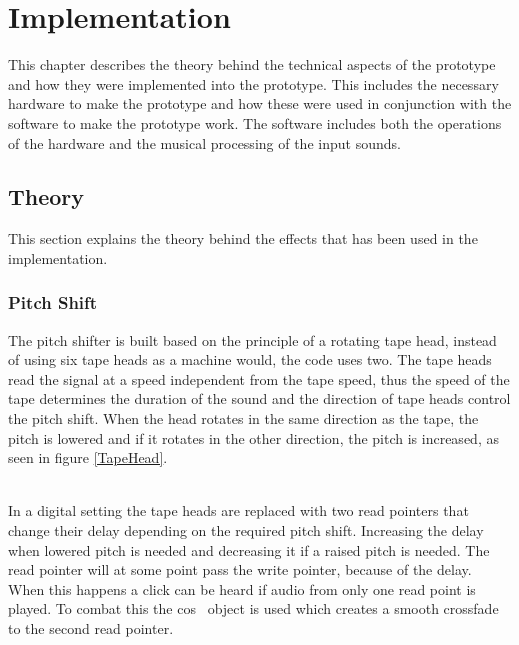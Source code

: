 \chapter{Implementation}

This chapter describes the theory behind the technical aspects of the prototype and how they were implemented into the prototype. This includes the necessary hardware to make the prototype and how these were used in conjunction with the software to make the prototype work. The software includes both the operations of the hardware and the musical processing of the input sounds.

\section{Theory}

This section explains the theory behind the effects that has been used in the implementation. 

\subsection{Pitch Shift}

The pitch shifter is built based on the principle of a rotating tape head, instead of using six tape heads as a machine would, the code uses two\citep{Katjaas_00}. The tape heads read the signal at a speed independent from the tape speed, thus the speed of the tape determines the duration of the sound and the direction of tape heads control the pitch shift. When the head rotates in the same direction as the tape, the pitch is lowered and if it rotates in the other direction, the pitch is increased, as seen in figure \ref{TapeHead}. \\

\begin{minipage}{\linewidth}%
\label{TapeHead}
\end{minipage}\\

In a digital setting the tape heads are replaced with two read pointers that change their delay depending on the required pitch shift. Increasing the delay when lowered pitch is needed and decreasing it if a raised pitch is needed. 
The read pointer will at some point pass the write pointer, because of the delay. When this happens a click can be heard if audio from only one read point is played. To combat this the cos~ object is used which creates a smooth crossfade to the second read pointer.

